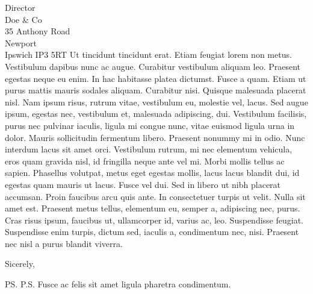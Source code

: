 \documentclass[a4paper]{scrlttr2}
\begin{document}
\begin{letter}{Director \\ Doe \& Co \\ 35 Anthony Road
\\ Newport \\ Ipswich IP3 5RT}
 Ut tincidunt tincidunt erat. Etiam feugiat lorem non metus. Vestibulum dapibus nunc ac augue. Curabitur vestibulum aliquam leo. Praesent egestas neque eu enim. In hac habitasse platea dictumst. Fusce a quam. Etiam ut purus mattis mauris sodales aliquam. Curabitur nisi. Quisque malesuada placerat nisl. Nam ipsum risus, rutrum vitae, vestibulum eu, molestie vel, lacus. Sed augue ipsum, egestas nec, vestibulum et, malesuada adipiscing, dui. Vestibulum facilisis, purus nec pulvinar iaculis, ligula mi congue nunc, vitae euismod ligula urna in dolor. Mauris sollicitudin fermentum libero. Praesent nonummy mi in odio. Nunc interdum lacus sit amet orci. Vestibulum rutrum, mi nec elementum vehicula, eros quam gravida nisl, id fringilla neque ante vel mi. Morbi mollis tellus ac sapien. Phasellus volutpat, metus eget egestas mollis, lacus lacus blandit dui, id egestas quam mauris ut lacus. Fusce vel dui. Sed in libero ut nibh placerat accumsan. Proin faucibus arcu quis ante. In consectetuer turpis ut velit. Nulla sit amet est. Praesent metus tellus, elementum eu, semper a, adipiscing nec, purus. Cras risus ipsum, faucibus ut, ullamcorper id, varius ac, leo. Suspendisse feugiat. Suspendisse enim turpis, dictum sed, iaculis a, condimentum nec, nisi. Praesent nec nisl a purus blandit viverra.

\closing{Sicerely,}

\ps{P.S. Fusce ac felis sit amet ligula pharetra condimentum.}


\end{letter}
\end{document}
